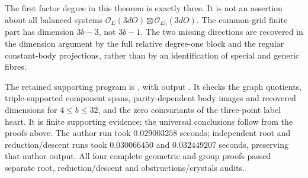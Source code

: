 \begin{remark}
\label{rem:mixed-strip-scope-candidate}
The first factor degree in this theorem is exactly three.
It is not an assertion about all balanced systems
$\mathcal O_E(3dO)\boxtimes\mathcal O_{E_0}(3dO)$.
The common-grid finite part has dimension $3b-3$, not
$3b-1$. The two missing directions are recovered in the
dimension argument by the full relative degree-one block
and the regular constant-body projections, rather than by
an identification of special and generic fibres.

The retained supporting program is
, with output
.
It checks the graph quotients, triple-supported component spans,
parity-dependent body images and recovered dimensions for
$4\le b\le32$, and the zero coinvariants of the three-point
label heart. It is finite supporting evidence; the universal
conclusions follow from the proofs above. The author run took
$0.029003258$ seconds; independent root and reduction/descent
runs took $0.030066450$ and $0.032449207$ seconds, preserving
that author output. All four complete geometric and group proofs
passed separate root, reduction/descent and obstructions/crystals
audits.
\end{remark}
